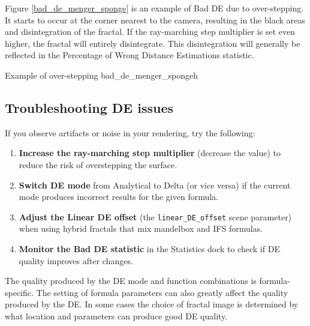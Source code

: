 Figure \ref{bad_de_menger_sponge} is an example of Bad DE due to over-stepping. It starts to occur at the corner nearest to the camera, resulting in the black areas and disintegration of the fractal. If the ray-marching step multiplier is set even higher, the fractal will entirely disintegrate. This disintegration will generally be reflected in the Percentage of Wrong Distance Estimations statistic.

{Example of over-stepping}
{bad_de_menger_sponge}{h}

\subsection{Troubleshooting DE issues}\label{de-troubleshooting}

If you observe artifacts or noise in your rendering, try the following:

\begin{enumerate}
	\item \textbf{Increase the ray-marching step multiplier} (decrease the value) to reduce the risk of overstepping the surface.
	\item \textbf{Switch DE mode} from Analytical to Delta (or vice versa) if the current mode produces incorrect results for the given formula.
	\item \textbf{Adjust the Linear DE offset} (the \texttt{linear\_DE\_offset} scene parameter) when using hybrid fractals that mix mandelbox and IFS formulas.
	\item \textbf{Monitor the Bad DE statistic} in the Statistics dock to check if DE quality improves after changes.
\end{enumerate}

The quality produced by the DE mode and function combinations is formula-specific. The setting of formula parameters can also greatly affect the quality produced by the DE. In some cases the choice of fractal image is determined by
what location and parameters can produce good DE quality.
